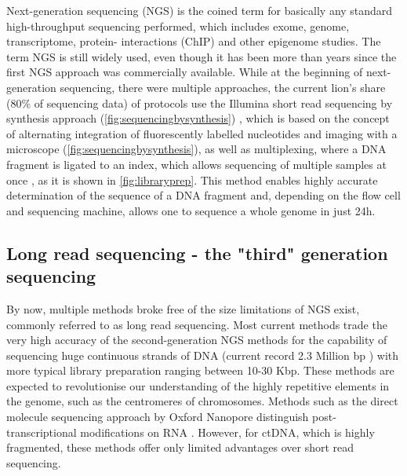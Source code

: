 Next-generation sequencing (NGS) is the coined term for basically any standard high-throughput sequencing performed, which includes exome, genome, transcriptome, \linebreak protein- interactions (ChIP) and other epigenome studies. The term NGS is still widely used, even though it has been more than  years since the first NGS approach was commercially available. While at the beginning of next-generation sequencing, there were multiple approaches, the current lion's share (80\% of sequencing data) of protocols use the Illumina short read sequencing by synthesis approach (\autoref{fig:sequencingbysynthesis}) \cite{Mardis2008,Straiton2019}, which is based on the concept of alternating integration of fluorescently labelled nucleotides and imaging with a microscope (\autoref{fig:sequencingbysynthesis}), as well as multiplexing, where a DNA fragment is ligated to an index, which allows sequencing of multiple samples at once \cite{Church1984,Church1988}, as it is shown in \autoref{fig:libraryprep}. This method enables highly accurate determination of the sequence of a DNA fragment and, depending on the flow cell and sequencing machine, allows one to sequence a whole genome in just 24h.

\subsection[Long read sequencing]{Long read sequencing - the "third" generation sequencing}
\label{intro-sec:lrs}
By now, multiple methods  broke free of the size limitations of NGS exist, commonly referred to as long read sequencing. Most current methods trade the very high accuracy of the second-generation NGS methods for the capability of sequencing huge continuous strands of DNA (current record 2.3 Million bp \cite{Payne2018}) with more typical library preparation ranging between 10-30 Kbp. 
These methods are expected to revolutionise our understanding of the highly repetitive elements in the genome, such as the centromeres of chromosomes. Methods such as the direct molecule sequencing approach by Oxford Nanopore  distinguish post-transcriptional modifications on RNA \cite{Pratanwanich2021}.
However, for ctDNA, which is highly fragmented, these methods offer only limited advantages over short read sequencing.

